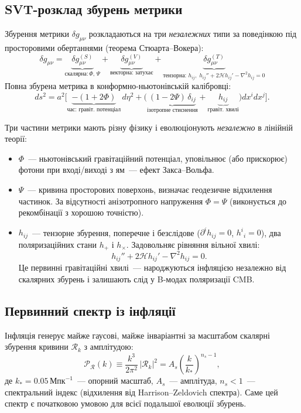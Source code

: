 \documentclass[12pt, a4paper]{article}
\begin{document}
\subsection*{SVT-розклад збурень метрики}

Збурення метрики $\delta g_{\mu\nu}$ розкладаються на три
\emph{незалежних} типи за поведінкою під просторовими обертаннями
(теорема Стюарта--Вокера):
\[
  \delta g_{\mu\nu} =
    \underbrace{\delta g_{\mu\nu}^{(S)}}_{\text{скалярна}: \Phi,\,\Psi}
  + \underbrace{\delta g_{\mu\nu}^{(V)}}_{\text{векторна: затухає}}
  + \underbrace{\delta g_{\mu\nu}^{(T)}}_{
      \text{тензорна: } h_{ij},\; h_{ij}'' + 2\mathcal{H}h_{ij}' - \nabla^2 h_{ij} = 0
    }
\]
Повна збурена метрика в конформно-ньютонівській калібровці:
\[
  ds^2 = a^2\bigl[
    \underbrace{-(1+2\Phi)}_{\text{час: гравіт. потенціал}}\,d\eta^2
    + \bigl(
        \underbrace{(1-2\Psi)\,\delta_{ij}}_{\text{ізотропне стиснення}}
      + \underbrace{h_{ij}}_{\text{гравіт. хвилі}}
      \bigr)dx^i dx^j
  \bigr].
\]

Три частини метрики мають різну фізику і еволюціонують \emph{незалежно}
в лінійній теорії:
\begin{itemize}
  \item $\Phi$~--- ньютонівський гравітаційний потенціал,
        уповільнює (або прискорює) фотони при вході/виході з ям~---
        ефект Закса--Вольфа.
  \item $\Psi$~--- кривина просторових поверхонь,
        визначає геодезичне відхилення частинок.
        За відсутності анізотропного напруження $\Phi = \Psi$
        (виконується до рекомбінації з хорошою точністю).
  \item $h_{ij}$~--- тензорне збурення, поперечне і безслідове
        ($\partial^i h_{ij} = 0$, $h^i{}_i = 0$),
        два поляризаційних стани $h_+$ і $h_\times$.
        Задовольняє рівняння вільної хвилі:
        \[
          h_{ij}'' + 2\mathcal{H}h_{ij}' - \nabla^2 h_{ij} = 0.
        \]
        Це первинні гравітаційні хвилі~--- народжуються інфляцією
        незалежно від скалярних збурень і залишають слід у
        B-модах поляризації CMB.
\end{itemize}

\subsection*{Первинний спектр із інфляції}

Інфляція генерує майже гаусові, майже інваріантні за масштабом
скалярні збурення кривини $\mathcal{R}_k$ з амплітудою:
\[
  \mathcal{P}_{\mathcal{R}}(k)
    \equiv \frac{k^3}{2\pi^2}\,|\mathcal{R}_k|^2
    = A_s \left(\frac{k}{k_*}\right)^{n_s-1},
\]
де $k_* = 0.05\,\mathrm{Мпк}^{-1}$~--- опорний масштаб,
$A_s$~--- амплітуда, $n_s < 1$~--- спектральний індекс
(відхилення від Harrison--Zeldovich спектра).
Саме цей спектр є початковою умовою для всієї подальшої еволюції збурень.
\end{document}
